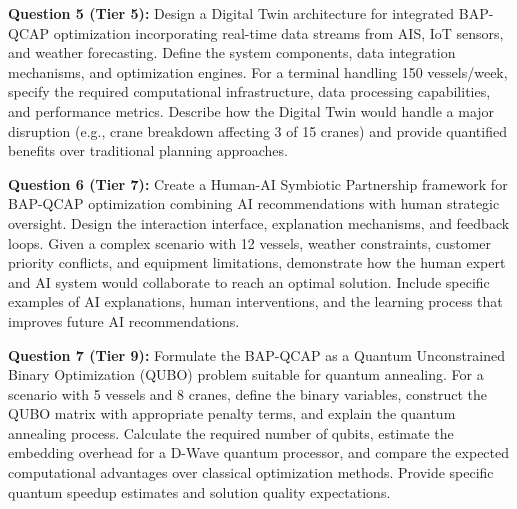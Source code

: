 \documentclass{article}
\begin{document}
\textbf{Question 5 (Tier 5):} Design a Digital Twin architecture for integrated BAP-QCAP optimization incorporating real-time data streams from AIS, IoT sensors, and weather forecasting. Define the system components, data integration mechanisms, and optimization engines. For a terminal handling 150 vessels/week, specify the required computational infrastructure, data processing capabilities, and performance metrics. Describe how the Digital Twin would handle a major disruption (e.g., crane breakdown affecting 3 of 15 cranes) and provide quantified benefits over traditional planning approaches.

\textbf{Question 6 (Tier 7):} Create a Human-AI Symbiotic Partnership framework for BAP-QCAP optimization combining AI recommendations with human strategic oversight. Design the interaction interface, explanation mechanisms, and feedback loops. Given a complex scenario with 12 vessels, weather constraints, customer priority conflicts, and equipment limitations, demonstrate how the human expert and AI system would collaborate to reach an optimal solution. Include specific examples of AI explanations, human interventions, and the learning process that improves future AI recommendations.

\textbf{Question 7 (Tier 9):} Formulate the BAP-QCAP as a Quantum Unconstrained Binary Optimization (QUBO) problem suitable for quantum annealing. For a scenario with 5 vessels and 8 cranes, define the binary variables, construct the QUBO matrix with appropriate penalty terms, and explain the quantum annealing process. Calculate the required number of qubits, estimate the embedding overhead for a D-Wave quantum processor, and compare the expected computational advantages over classical optimization methods. Provide specific quantum speedup estimates and solution quality expectations.
\end{document}
